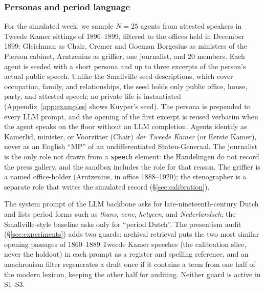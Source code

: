 \documentclass[sigconf,review,anonymous]{acmart}
\begin{document}
\subsubsection{Personas and period language}
\label{sec:personas}
For the simulated week, we sample $N{=}25$ agents from attested speakers
in Tweede Kamer sittings of 1896--1899, filtered to the offices held in
December 1899: Gleichman as Chair, Cremer and Goeman Borgesius as
ministers of the Pierson cabinet, Arntzenius as griffier, one journalist,
and 20 members. Each agent is seeded with a short persona and up to three
excerpts of the person's actual public speech. Unlike the Smallville
seed descriptions, which cover occupation, family, and relationships, the
seed holds only public office, house, party, and attested speech; no
private life is instantiated (Appendix~\ref{app:examples} shows Kuyper's
seed). The persona is prepended to every LLM
prompt, and the opening of the first excerpt is reused verbatim when the
agent speaks on the floor without an LLM completion. Agents identify as
Kamerlid, minister, or Voorzitter (Chair) \emph{der Tweede Kamer} (or
Eerste Kamer), never as an English ``MP'' of an undifferentiated
Staten-Generaal. The journalist is the only role not drawn from a
\texttt{speech} element: the Handelingen do not record the press gallery,
and the sandbox includes the role for that reason. The griffier is a
named office-holder (Arntzenius, in office 1888--1920); the stenographer is
a separate role that writes the simulated record (\S\ref{sec:calibration}).

The system prompt of the LLM backbone asks
for late-nineteenth-century Dutch and lists period forms such as
\emph{thans}, \emph{eene}, \emph{hetgeen}, and \emph{Nederlandsch}; the
Smallville-style baseline asks only for ``period Dutch''. The presentism
audit (\S\ref{sec:experiments}) adds two guards: archival retrieval puts
the two most similar opening passages of 1860--1889 Tweede Kamer speeches
(the calibration slice, never the holdout) in each prompt as a register
and spelling reference, and an anachronism filter regenerates a draft once
if it contains a term from one half of the modern lexicon, keeping the
other half for auditing. Neither guard is active in S1--S3.
\end{document}
